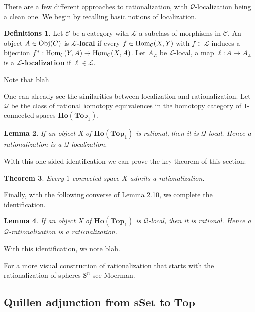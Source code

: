 \documentclass[psamsfonts]{amsart}
\newtheorem{thm}{Theorem}[section]
\newtheorem{lem}[thm]{Lemma}
\theoremstyle{definition}
\newtheorem{defns}[thm]{Definitions}
\theoremstyle{remark}
\newcommand{\s}{\mathbf{S}}
\newcommand{\Hom}{\textup{Hom}}
\newcommand{\Ho}{\mathbf{Ho}}
\newcommand{\Top}{\mathbf{Top}}
\newcommand{\Obj}{\textup{Obj}}
\newcommand{\sSet}{\mathbf{sSet}}
\numberwithin{equation}{section}
\begin{document}
There are a few different approaches to rationalization, with $\mathcal{Q}$-localization being a clean one. We begin by recalling basic notions of localization.

\begin{defns}
Let $\mathcal{C}$ be a category with $\mathcal{L}$ a subclass of morphisms in $\mathcal{C}$. An object $A\in\Obj(C)$ is \textbf{$\mathcal{L}$-local} if every $f\in\Hom_\mathcal{C}(X,Y)$ with $f\in\mathcal{L}$ induces a bijection $f^\ast:\Hom_\mathcal{C}(Y,A)\to\Hom_\mathcal{C}(X,A)$. Let $A_\mathcal{L}$ be $\mathcal{L}$-local, a map $\ell:A\to A_\mathcal{L}$ is a \textbf{$\mathcal{L}$-localization} if $\ell\in\mathcal{L}$.
\end{defns}

Note that blah

One can already see the similarities between localization and rationalization. Let $\mathcal{Q}$ be the class of rational homotopy equivalences in the homotopy category of $1$-connected spaces $\Ho(\Top_1)$.

\begin{lem}
If an object $X$ of $\Ho(\Top_1)$ is rational, then it is $\mathcal{Q}$-local. Hence a rationalization is a $\mathcal{Q}$-localization.
\end{lem}

With this one-sided identification we can prove the key theorem of this section:

\begin{thm}
Every $1$-connected space $X$ admits a rationalization.
\end{thm}

Finally, with the following converse of Lemma 2.10, we complete the identification.

\begin{lem}
If an object $X$ of $\Ho(\Top_1)$ is $\mathcal{Q}$-local, then it is rational. Hence a $\mathcal{Q}$-rationalization is a rationalization.
\end{lem}

With this identification, we note blah.

For a more visual construction of rationalization that starts with the rationalization of spheres $\s^n$ see Moerman\cite{Moerman}.

\newpage
\subsection{Quillen adjunction from $\sSet$ to $\Top$}
\end{document}
